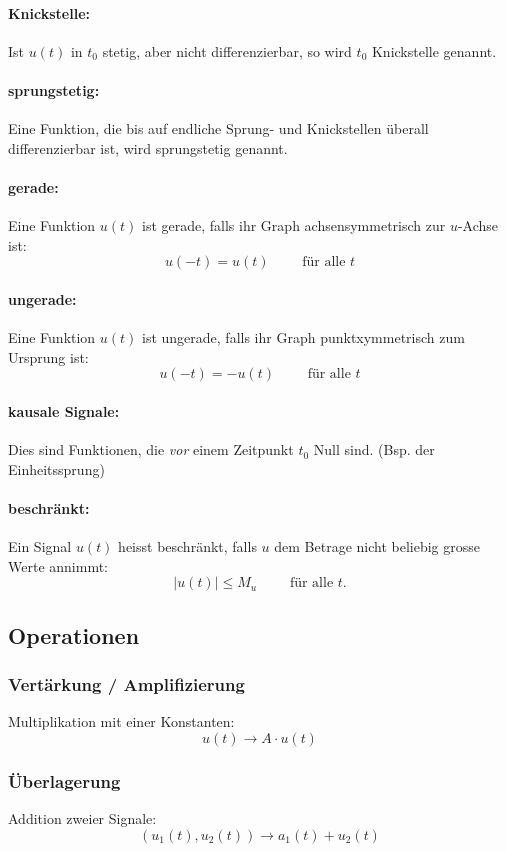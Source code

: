 \paragraph{Knickstelle:}
Ist $u(t)$ in $t_0$ stetig, aber nicht differenzierbar, so wird $t_0$ Knickstelle genannt.
\paragraph{sprungstetig:}
Eine Funktion, die bis auf endliche Sprung- und Knickstellen überall differenzierbar ist, wird sprungstetig genannt.
\paragraph{gerade:} Eine Funktion $u(t)$ ist gerade, falls ihr Graph achsensymmetrisch zur $u$-Achse ist:
\[
	u(-t) = u(t) \qquad \text{ für alle } t
\]
\paragraph{ungerade:} Eine Funktion $u(t)$ ist ungerade, falls ihr Graph punktxymmetrisch zum Ursprung ist:
\[
	u(-t) = -u(t) \qquad \text{ für alle } t
\]
\paragraph{kausale Signale:} Dies sind Funktionen, die \textit{vor} einem Zeitpunkt $t_0$ Null sind. (Bsp. der Einheitssprung)
\paragraph{beschränkt:} Ein Signal $u(t)$ heisst beschränkt, falls $u$ dem Betrage nicht beliebig grosse Werte annimmt:
\[
	\left| u(t) \right| \le M_u	\qquad \text{ für alle } t.
\]


\subsection{Operationen}
\subsubsection{Vertärkung / Amplifizierung}
Multiplikation mit einer Konstanten:
\[
	u(t) \rightarrow A \cdot u(t)
\]

\subsubsection{Überlagerung}
Addition zweier Signale:
\[
	(u_1(t),u_2(t)) \rightarrow a_1(t) + u_2(t)
\]

